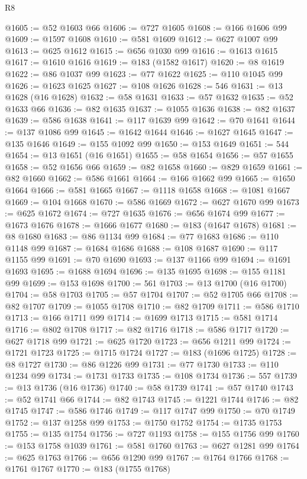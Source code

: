 \begin{lexlean}{R8}
\begin{coremodule}
@1605 := @52 @1603 @66
@1606 := @727 @1605
@1608 := @166 @1606 @99
@1609 := @1597 @1608
@1610 := @581 @1609
@1612 := @627 @1007 @99
@1613 := @625 @1612
@1615 := @656 @1030 @99
@1616 := @1613 @1615
@1617 := @1610 @1616
@1619 := @183 (@1582 @1617)
@1620 := @8 @1619
@1622 := @86 @1037 @99
@1623 := @77 @1622
@1625 := @110 @1045 @99
@1626 := @1623 @1625
@1627 := @108 @1626
@1628 := 546
@1631 := @13 @1628 (@16 @1628)
@1632 := @58 @1631
@1633 := @57 @1632
@1635 := @52 @1633 @66
@1636 := @82 @1635
@1637 := @1055 @1636
@1638 := @82 @1637
@1639 := @586 @1638
@1641 := @117 @1639 @99
@1642 := @70 @1641
@1644 := @137 @1086 @99
@1645 := @1642 @1644
@1646 := @1627 @1645
@1647 := @135 @1646
@1649 := @155 @1092 @99
@1650 := @153 @1649
@1651 := 544
@1654 := @13 @1651 (@16 @1651)
@1655 := @58 @1654
@1656 := @57 @1655
@1658 := @52 @1656 @66
@1659 := @82 @1658
@1660 := @829 @1659
@1661 := @82 @1660
@1662 := @586 @1661
@1664 := @166 @1662 @99
@1665 := @1650 @1664
@1666 := @581 @1665
@1667 := @1118 @1658
@1668 := @1081 @1667
@1669 := @104 @1668
@1670 := @586 @1669
@1672 := @627 @1670 @99
@1673 := @625 @1672
@1674 := @727 @1635
@1676 := @656 @1674 @99
@1677 := @1673 @1676
@1678 := @1666 @1677
@1680 := @183 (@1647 @1678)
@1681 := @8 @1680
@1683 := @86 @1134 @99
@1684 := @77 @1683
@1686 := @110 @1148 @99
@1687 := @1684 @1686
@1688 := @108 @1687
@1690 := @117 @1155 @99
@1691 := @70 @1690
@1693 := @137 @1166 @99
@1694 := @1691 @1693
@1695 := @1688 @1694
@1696 := @135 @1695
@1698 := @155 @1181 @99
@1699 := @153 @1698
@1700 := 561
@1703 := @13 @1700 (@16 @1700)
@1704 := @58 @1703
@1705 := @57 @1704
@1707 := @52 @1705 @66
@1708 := @82 @1707
@1709 := @1055 @1708
@1710 := @82 @1709
@1711 := @586 @1710
@1713 := @166 @1711 @99
@1714 := @1699 @1713
@1715 := @581 @1714
@1716 := @802 @1708
@1717 := @82 @1716
@1718 := @586 @1717
@1720 := @627 @1718 @99
@1721 := @625 @1720
@1723 := @656 @1211 @99
@1724 := @1721 @1723
@1725 := @1715 @1724
@1727 := @183 (@1696 @1725)
@1728 := @8 @1727
@1730 := @86 @1226 @99
@1731 := @77 @1730
@1733 := @110 @1234 @99
@1734 := @1731 @1733
@1735 := @108 @1734
@1736 := 557
@1739 := @13 @1736 (@16 @1736)
@1740 := @58 @1739
@1741 := @57 @1740
@1743 := @52 @1741 @66
@1744 := @82 @1743
@1745 := @1221 @1744
@1746 := @82 @1745
@1747 := @586 @1746
@1749 := @117 @1747 @99
@1750 := @70 @1749
@1752 := @137 @1258 @99
@1753 := @1750 @1752
@1754 := @1735 @1753
@1755 := @135 @1754
@1756 := @727 @1193
@1758 := @155 @1756 @99
@1760 := @153 @1758 @1039
@1761 := @581 @1760
@1763 := @627 @1281 @99
@1764 := @625 @1763
@1766 := @656 @1290 @99
@1767 := @1764 @1766
@1768 := @1761 @1767
@1770 := @183 (@1755 @1768)

\end{coremodule}
\end{lexlean}

